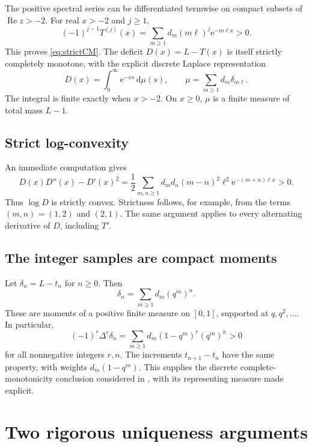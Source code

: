 \documentclass[11pt,letterpaper]{article}
\theoremstyle{definition}\newtheorem{definition}[theorem]{Definition}
\theoremstyle{remark}\newtheorem{remark}[theorem]{Remark}
\newcommand{\Ree}{\operatorname{Re}}
\newcommand{\dd}{\,\mathrm d}
\newcommand{\ee}{\mathrm e}
\numberwithin{equation}{section}
\begin{document}
The positive spectral series can be differentiated termwise on compact subsets of $\Ree z>-2$. For real $x>-2$ and $j\geq1$,
\begin{equation}\label{eq:derivatives}
 (-1)^{j-1}T^{(j)}(x)
 =\sum_{m\geq1}d_m(m\ell)^j\ee^{-m\ell x}>0.
\end{equation}
This proves \eqref{eq:strictCM}. The deficit $D(x)=L-T(x)$ is itself strictly completely monotone, with the explicit discrete Laplace representation
\begin{equation}\label{eq:laplace}
 D(x)=\int_0^\infty\ee^{-xs}\dd\mu(s),\qquad
 \mu=\sum_{m\geq1}d_m\delta_{m\ell}.
\end{equation}
The integral is finite exactly when $x>-2$. On $x\geq0$, $\mu$ is a finite measure of total mass $L-1$.

\subsection{Strict log-convexity}
An immediate computation gives
\begin{equation}\label{eq:logconvex}
 D(x)D''(x)-D'(x)^2
 =\frac12\sum_{m,n\geq1}d_md_n(m-n)^2\ell^2
 \ee^{-(m+n)\ell x}>0.
\end{equation}
Thus $\log D$ is strictly convex. Strictness follows, for example, from the terms $(m,n)=(1,2)$ and $(2,1)$. The same argument applies to every alternating derivative of $D$, including $T'$.

\subsection{The integer samples are compact moments}
Let $\delta_n=L-t_n$ for $n\geq0$. Then
\begin{equation}\label{eq:moments}
 \delta_n=\sum_{m\geq1}d_m(q^m)^n.
\end{equation}
These are moments of a positive finite measure on $[0,1]$, supported at $q,q^2,\ldots$. In particular,
\begin{equation}\label{eq:differences}
 (-1)^r\Delta^r\delta_n
 =\sum_{m\geq1}d_m(1-q^m)^r(q^m)^n>0
\end{equation}
for all nonnegative integers $r,n$. The increments $t_{n+1}-t_n$ have the same property, with weights $d_m(1-q^m)$. This supplies the discrete complete-monotonicity conclusion considered in \cite{MSE2016}, with its representing measure made explicit.

\section{Two rigorous uniqueness arguments}\label{sec:unique}
\end{document}
